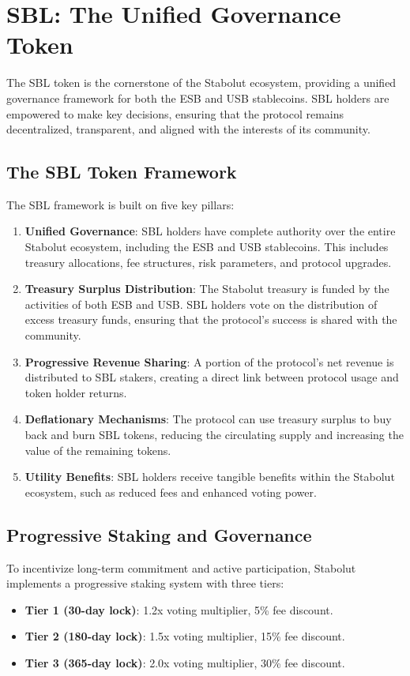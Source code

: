 \section{SBL: The Unified Governance Token}
The SBL token is the cornerstone of the Stabolut ecosystem, providing a unified governance framework for both the ESB and USB stablecoins. SBL holders are empowered to make key decisions, ensuring that the protocol remains decentralized, transparent, and aligned with the interests of its community.

\subsection{The SBL Token Framework}
The SBL framework is built on five key pillars:
\begin{enumerate}
    \item \textbf{Unified Governance}: SBL holders have complete authority over the entire Stabolut ecosystem, including the ESB and USB stablecoins. This includes treasury allocations, fee structures, risk parameters, and protocol upgrades.
    \item \textbf{Treasury Surplus Distribution}: The Stabolut treasury is funded by the activities of both ESB and USB. SBL holders vote on the distribution of excess treasury funds, ensuring that the protocol's success is shared with the community.
    \item \textbf{Progressive Revenue Sharing}: A portion of the protocol's net revenue is distributed to SBL stakers, creating a direct link between protocol usage and token holder returns.
    \item \textbf{Deflationary Mechanisms}: The protocol can use treasury surplus to buy back and burn SBL tokens, reducing the circulating supply and increasing the value of the remaining tokens.
    \item \textbf{Utility Benefits}: SBL holders receive tangible benefits within the Stabolut ecosystem, such as reduced fees and enhanced voting power.
\end{enumerate}

\subsection{Progressive Staking and Governance}
To incentivize long-term commitment and active participation, Stabolut implements a progressive staking system with three tiers:

\begin{itemize}
    \item \textbf{Tier 1 (30-day lock)}: 1.2x voting multiplier, 5\% fee discount.
    \item \textbf{Tier 2 (180-day lock)}: 1.5x voting multiplier, 15\% fee discount.
    \item \textbf{Tier 3 (365-day lock)}: 2.0x voting multiplier, 30\% fee discount.
\end{itemize}

